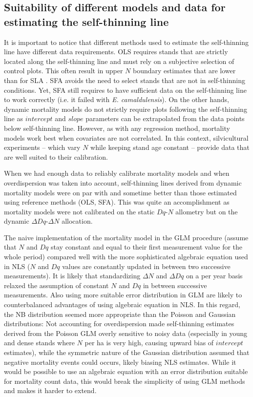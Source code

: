 \documentclass[12pt,english]{article}
\begin{document}
\subsection{Suitability of different models and data for estimating the self-thinning line}
It is important to notice that different methods used to estimate the self-thinning line have different data requirements. OLS requires stands that are strictly located along the self-thinning line and must rely on a subjective selection of control plots. This often result in upper $N$ boundary estimates that are lower than for SLA \citep{ZhangBiGoveEtAl2005}. SFA avoids the need to select stands that are not in self-thinning conditions. Yet, SFA still requires to have sufficient data on the self-thinning line to work correctly (i.e. it failed with \textit{E. camaldulensis}). On the other hands, dynamic mortality models do not strictly require plots following the self-thinning line as $intercept$ and $slope$ parameters can be extrapolated from the data points below self-thinning line. However, as with any regression method, mortality models work best when covariates are not correlated. In this context, silvicultural experiments -- which vary $N$ while keeping stand age constant -- provide data that are well suited to their calibration.

When we had enough data to reliably calibrate mortality models and when overdispersion was taken into account, self-thinning lines derived from dynamic mortality models were on par with and sometime better than those estimated using reference methods (OLS, SFA). This was quite an accomplishment as mortality models were not calibrated on the static $Dq$-$N$ allometry but on the dynamic $\Delta Dq$-$\Delta N$ allocation. 

The naive implementation of the mortality model in the GLM procedure (assume that $N$ and $Dq$ stay constant and equal to their first measurement value for the whole period) compared well with the more sophisticated algebraic equation used in NLS ($N$ and $Dq$ values are constantly updated in between two successive measurements). It is likely that standardizing $\Delta N$ and $\Delta Dq$ on a per year basis relaxed the assumption of constant $N$ and $Dq$ in between successive measurements. Also using more suitable error distribution in GLM are likely to counterbalanced advantages of using algebraic equation in NLS. In this regard, the NB distribution seemed more appropriate than the Poisson and Gaussian distributions: Not accounting for overdispersion made self-thinning estimates derived from the Poisson GLM overly sensitive to noisy data (especially in young and dense stands where $N$ per ha is very high, causing upward bias of $intercept$ estimates), while the symmetric nature of the Gaussian
distribution assumed that negative mortality events could occurs, likely biasing NLS estimates. While it would be possible to use an algebraic equation with an error distribution suitable for mortality count data, this would break the simplicity of using GLM methods and makes it harder to extend.
\end{document}
